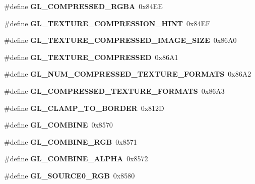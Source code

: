 \begin{DoxyCompactItemize}
\item 
\#define {\bfseries G\+L\+\_\+\+C\+O\+M\+P\+R\+E\+S\+S\+E\+D\+\_\+\+R\+G\+B\+A}~0x84\+E\+E\label{_s_d_l__opengl_8h_a61f07c72b49869caa447fed2d8ab892b}

\item 
\#define {\bfseries G\+L\+\_\+\+T\+E\+X\+T\+U\+R\+E\+\_\+\+C\+O\+M\+P\+R\+E\+S\+S\+I\+O\+N\+\_\+\+H\+I\+N\+T}~0x84\+E\+F\label{_s_d_l__opengl_8h_a7970d7bc60644feb1efd44ac9ce1e796}

\item 
\#define {\bfseries G\+L\+\_\+\+T\+E\+X\+T\+U\+R\+E\+\_\+\+C\+O\+M\+P\+R\+E\+S\+S\+E\+D\+\_\+\+I\+M\+A\+G\+E\+\_\+\+S\+I\+Z\+E}~0x86\+A0\label{_s_d_l__opengl_8h_ad70b42f24717cb3f3c3c494a7e45d488}

\item 
\#define {\bfseries G\+L\+\_\+\+T\+E\+X\+T\+U\+R\+E\+\_\+\+C\+O\+M\+P\+R\+E\+S\+S\+E\+D}~0x86\+A1\label{_s_d_l__opengl_8h_a72b1a842a461287f48c6e9601243bbee}

\item 
\#define {\bfseries G\+L\+\_\+\+N\+U\+M\+\_\+\+C\+O\+M\+P\+R\+E\+S\+S\+E\+D\+\_\+\+T\+E\+X\+T\+U\+R\+E\+\_\+\+F\+O\+R\+M\+A\+T\+S}~0x86\+A2\label{_s_d_l__opengl_8h_a88d44856e13232d3c0bec297fd38d627}

\item 
\#define {\bfseries G\+L\+\_\+\+C\+O\+M\+P\+R\+E\+S\+S\+E\+D\+\_\+\+T\+E\+X\+T\+U\+R\+E\+\_\+\+F\+O\+R\+M\+A\+T\+S}~0x86\+A3\label{_s_d_l__opengl_8h_a393084c570497e0e45cd3946c1a130b1}

\item 
\#define {\bfseries G\+L\+\_\+\+C\+L\+A\+M\+P\+\_\+\+T\+O\+\_\+\+B\+O\+R\+D\+E\+R}~0x812\+D\label{_s_d_l__opengl_8h_aa5d86f453ce19bef15e848d313c653e2}

\item 
\#define {\bfseries G\+L\+\_\+\+C\+O\+M\+B\+I\+N\+E}~0x8570\label{_s_d_l__opengl_8h_afa40fcd465207b4de60ccfddcc77248e}

\item 
\#define {\bfseries G\+L\+\_\+\+C\+O\+M\+B\+I\+N\+E\+\_\+\+R\+G\+B}~0x8571\label{_s_d_l__opengl_8h_ae89fd86422b8c78e1eac7c255b56ebce}

\item 
\#define {\bfseries G\+L\+\_\+\+C\+O\+M\+B\+I\+N\+E\+\_\+\+A\+L\+P\+H\+A}~0x8572\label{_s_d_l__opengl_8h_a9df51268efd1d3926d9cc3cd9bad25c1}

\item 
\#define {\bfseries G\+L\+\_\+\+S\+O\+U\+R\+C\+E0\+\_\+\+R\+G\+B}~0x8580\label{_s_d_l__opengl_8h_ae1fd330f86e60ac3438e8b1df3f7a7ba}


\end{DoxyCompactItemize}
